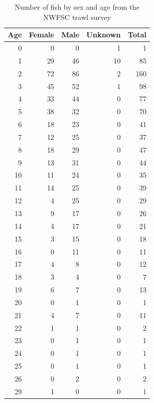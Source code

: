 \documentclass[12pt,]{article}
\begin{document}
\begin{table}[ht]
\centering
\caption{Number of fish by sex and age from the NWFSC trawl survey} 
\label{tab:sex_ratio}
\begin{tabular}{rrrrr}
  \hline
Age & Female & Male & Unknown & Total \\ 
  \hline
  0 &   0 &   0 &   1 &   1 \\ 
    1 &  29 &  46 &  10 &  85 \\ 
    2 &  72 &  86 &   2 & 160 \\ 
    3 &  45 &  52 &   1 &  98 \\ 
    4 &  33 &  44 &   0 &  77 \\ 
    5 &  38 &  32 &   0 &  70 \\ 
    6 &  18 &  23 &   0 &  41 \\ 
    7 &  12 &  25 &   0 &  37 \\ 
    8 &  18 &  29 &   0 &  47 \\ 
    9 &  13 &  31 &   0 &  44 \\ 
   10 &  11 &  24 &   0 &  35 \\ 
   11 &  14 &  25 &   0 &  39 \\ 
   12 &   4 &  25 &   0 &  29 \\ 
   13 &   9 &  17 &   0 &  26 \\ 
   14 &   4 &  17 &   0 &  21 \\ 
   15 &   3 &  15 &   0 &  18 \\ 
   16 &   0 &  11 &   0 &  11 \\ 
   17 &   4 &   8 &   0 &  12 \\ 
   18 &   3 &   4 &   0 &   7 \\ 
   19 &   6 &   7 &   0 &  13 \\ 
   20 &   0 &   1 &   0 &   1 \\ 
   21 &   4 &   7 &   0 &  11 \\ 
   22 &   1 &   1 &   0 &   2 \\ 
   23 &   0 &   1 &   0 &   1 \\ 
   24 &   0 &   1 &   0 &   1 \\ 
   25 &   0 &   1 &   0 &   1 \\ 
   26 &   0 &   2 &   0 &   2 \\ 
   29 &   1 &   0 &   0 &   1 \\ 
   \hline
\end{tabular}
\end{table}

\FloatBarrier
\end{document}
